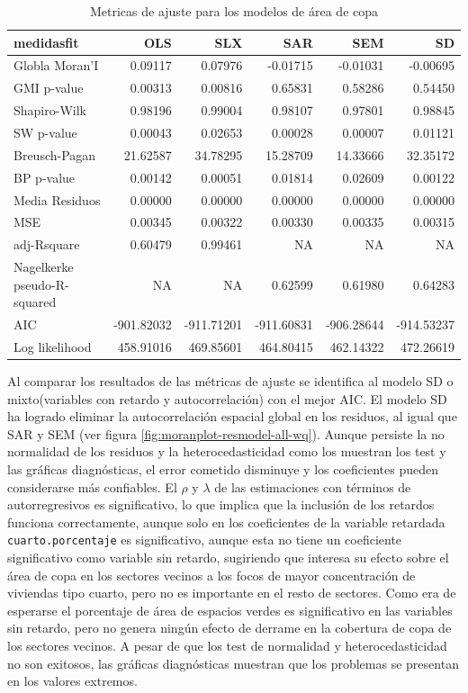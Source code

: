\documentclass[12pt,]{book}
\begin{document}
\begin{table}

\caption{\label{tab:tabla-comp-modelos-copa}Metricas de ajuste para los modelos de área de copa}
\centering
\begin{tabular}[t]{l|r|r|r|r|r}
\hline
medidasfit & OLS & SLX & SAR & SEM & SD\\
\hline
Globla Moran'I & 0.09117 & 0.07976 & -0.01715 & -0.01031 & -0.00695\\
\hline
GMI p-value & 0.00313 & 0.00816 & 0.65831 & 0.58286 & 0.54450\\
\hline
Shapiro-Wilk & 0.98196 & 0.99004 & 0.98107 & 0.97801 & 0.98845\\
\hline
SW p-value & 0.00043 & 0.02653 & 0.00028 & 0.00007 & 0.01121\\
\hline
Breusch-Pagan & 21.62587 & 34.78295 & 15.28709 & 14.33666 & 32.35172\\
\hline
BP p-value & 0.00142 & 0.00051 & 0.01814 & 0.02609 & 0.00122\\
\hline
Media Residuos & 0.00000 & 0.00000 & 0.00000 & 0.00000 & 0.00000\\
\hline
MSE & 0.00345 & 0.00322 & 0.00330 & 0.00335 & 0.00315\\
\hline
adj-Rsquare & 0.60479 & 0.99461 & NA & NA & NA\\
\hline
Nagelkerke pseudo-R-squared & NA & NA & 0.62599 & 0.61980 & 0.64283\\
\hline
AIC & -901.82032 & -911.71201 & -911.60831 & -906.28644 & -914.53237\\
\hline
Log likelihood & 458.91016 & 469.85601 & 464.80415 & 462.14322 & 472.26619\\
\hline
\end{tabular}
\end{table}

Al comparar los resultados de las métricas de ajuste se identifica al
modelo SD o mixto(variables con retardo y autocorrelación) con el mejor
AIC. El modelo SD ha logrado eliminar la autocorrelación espacial global
en los residuos, al igual que SAR y SEM (ver figura
\ref{fig:moranplot-resmodel-all-wq}). Aunque persiste la no normalidad
de los residuos y la heterocedasticidad como los muestran los test y las
gráficas diagnósticas, el error cometido disminuye y los coeficientes
pueden considerarse más confiables. El \(\rho\) y \(\lambda\) de las
estimaciones con términos de autorregresivos es significativo, lo que
implica que la inclusión de los retardos funciona correctamente, aunque
solo en los coeficientes de la variable retardada
\texttt{cuarto.porcentaje} es significativo, aunque esta no tiene un
coeficiente significativo como variable sin retardo, sugiriendo que
interesa su efecto sobre el área de copa en los sectores vecinos a los
focos de mayor concentración de viviendas tipo cuarto, pero no es
importante en el resto de sectores. Como era de esperarse el porcentaje
de área de espacios verdes es significativo en las variables sin
retardo, pero no genera ningún efecto de derrame en la cobertura de copa
de los sectores vecinos. A pesar de que los test de normalidad y
heterocedasticidad no son exitosos, las gráficas diagnósticas muestran
que los problemas se presentan en los valores extremos.
\end{document}
